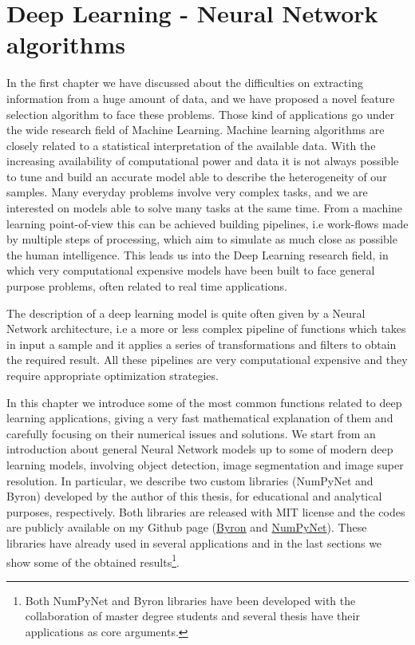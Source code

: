 \documentclass{standalone}
\begin{document}
\chapter[Deep Learning]{Deep Learning - Neural Network algorithms}\label{chapter2:neural}

In the first chapter we have discussed about the difficulties on extracting information from a huge amount of data, and we have proposed a novel feature selection algorithm to face these problems.
Those kind of applications go under the wide research field of Machine Learning.
Machine learning algorithms are closely related to a statistical interpretation of the available data.
With the increasing availability of computational power and data it is not always possible to tune and build an accurate model able to describe the heterogeneity of our samples.
Many everyday problems involve very complex tasks, and we are interested on models able to solve many tasks at the same time.
From a machine learning point-of-view this can be achieved building pipelines, i.e work-flows made by multiple steps of processing, which aim to simulate as much close as possible the human intelligence.
This leads us into the Deep Learning research field, in which very computational expensive models have been built to face general purpose problems, often related to real time applications.

The description of a deep learning model is quite often given by a Neural Network architecture, i.e a more or less complex pipeline of functions which takes in input a sample and it applies a series of transformations and filters to obtain the required result.
All these pipelines are very computational expensive and they require appropriate optimization strategies.

In this chapter we introduce some of the most common functions related to deep learning applications, giving a very fast mathematical explanation of them and carefully focusing on their numerical issues and solutions.
We start from an introduction about general Neural Network models up to some of modern deep learning models, involving object detection, image segmentation and image super resolution.
In particular, we describe two custom libraries (\textsf{NumPyNet} and \textsf{Byron}) developed by the author of this thesis, for educational and analytical purposes, respectively.
Both libraries are released with MIT license and the codes are publicly available on my Github page (\href{https://github.com/Nico-Curti/Byron}{Byron} and \href{https://github.com/Nico-Curti/NumPyNet}{NumPyNet}).
These libraries have already used in several applications and in the last sections we show some of the obtained results\footnote{
  Both \textsf{NumPyNet} and \textsf{Byron} libraries have been developed with the collaboration of master degree students and several thesis have their applications as core arguments.
}.
\end{document}
